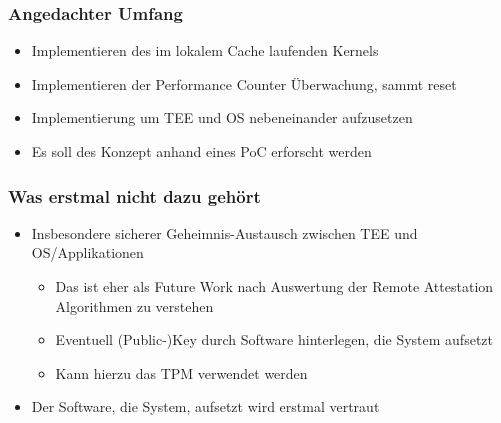 \documentclass{beamer}
\begin{document}
\begin{frame}
    \frametitle{Angedachter Umfang}
    \begin{itemize}
        \item Implementieren des im lokalem Cache laufenden Kernels
        \item Implementieren der Performance Counter Überwachung, sammt reset
        \item Implementierung um TEE und OS nebeneinander aufzusetzen
        \item Es soll des Konzept anhand eines PoC erforscht werden
    \end{itemize}
\end{frame}

\begin{frame}
    \frametitle{Was erstmal nicht dazu gehört}
    \begin{itemize}
        \item Insbesondere sicherer Geheimnis-Austausch zwischen TEE und OS/Applikationen
              \begin{itemize}
                  \item Das ist eher als Future Work nach Auswertung der Remote Attestation Algorithmen zu verstehen
                  \item Eventuell (Public-)Key durch Software hinterlegen, die System aufsetzt
                  \item Kann hierzu das TPM verwendet werden
              \end{itemize}
        \item Der Software, die System, aufsetzt wird erstmal vertraut
    \end{itemize}
\end{frame}
\end{document}
